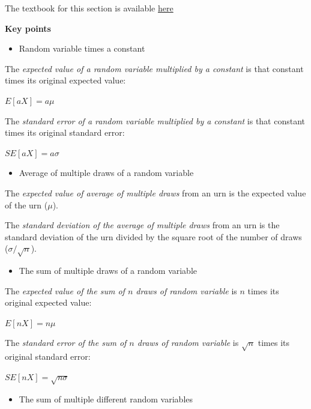\documentclass[
]{article}
\providecommand{\tightlist}{%
  \setlength{\itemsep}{0pt}\setlength{\parskip}{0pt}}
\begin{document}
The textbook for this section is available
\href{https://rafalab.github.io/dsbook/random-variables.html\#statistical-properties-of-averages}{here}

\textbf{Key points}

\begin{itemize}
\tightlist
\item
  Random variable times a constant
\end{itemize}

The \emph{expected value of a random variable multiplied by a constant}
is that constant times its original expected value:

\(E \left [aX \right ] = a \mu\)

The \emph{standard error of a random variable multiplied by a constant}
is that constant times its original standard error:

\(SE \left [aX \right ] = a \sigma\)

\begin{itemize}
\tightlist
\item
  Average of multiple draws of a random variable
\end{itemize}

The \emph{expected value of average of multiple draws} from an urn is
the expected value of the urn (\(\mu\)).

The \emph{standard deviation of the average of multiple draws} from an
urn is the standard deviation of the urn divided by the square root of
the number of draws (\(\sigma / \sqrt{n}\)).

\begin{itemize}
\tightlist
\item
  The sum of multiple draws of a random variable
\end{itemize}

The \emph{expected value of the sum of \(n\) draws of random variable}
is \(n\) times its original expected value:

\(E \left [nX \right ] = n \mu\)

The \emph{standard error of the sum of \(n\) draws of random variable}
is \(\sqrt{n}\) times its original standard error:

\(SE \left [nX \right ] = \sqrt{n \sigma}\)

\begin{itemize}
\tightlist
\item
  The sum of multiple different random variables
\end{itemize}
\end{document}

